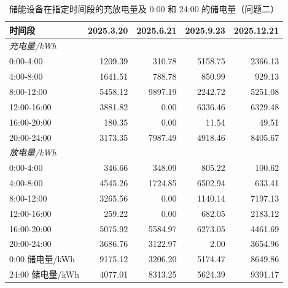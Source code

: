 \begin{table}[H]
\centering
{}
\begin{tabular}{lrrrr}
\toprule
时间段 & 2025.3.20 & 2025.6.21 & 2025.9.23 & 2025.12.21 \\
\midrule
\multicolumn{5}{l}{\textit{充电量/kWh}} \\
0:00-4:00 & 1209.39 & 310.78 & 5158.75 & 2366.13 \\
4:00-8:00 & 1641.51 & 788.78 & 850.99 & 929.13 \\
8:00-12:00 & 5458.12 & 9897.19 & 2242.72 & 5251.08 \\
12:00-16:00 & 3881.82 & 0.00 & 6336.46 & 6329.48 \\
16:00-20:00 & 180.35 & 0.00 & 11.54 & 49.51 \\
20:00-24:00 & 3173.35 & 7987.49 & 4918.46 & 8405.67 \\
\midrule
\multicolumn{5}{l}{\textit{放电量/kWh}} \\
0:00-4:00 & 346.66 & 348.09 & 805.22 & 100.62 \\
4:00-8:00 & 4545.26 & 1724.85 & 6502.94 & 633.41 \\
8:00-12:00 & 3265.56 & 0.00 & 1140.14 & 7197.13 \\
12:00-16:00 & 259.22 & 0.00 & 682.05 & 2183.12 \\
16:00-20:00 & 5075.92 & 5584.97 & 6273.05 & 4461.69 \\
20:00-24:00 & 3686.76 & 3122.97 & 2.00 & 3654.96 \\
\midrule
0:00 储电量/kWh & 9175.12 & 3206.20 & 5174.47 & 8649.86 \\
24:00 储电量/kWh & 4077.01 & 8313.25 & 5624.39 & 9391.17 \\
\bottomrule
\end{tabular}
\caption{储能设备在指定时间段的充放电量及 0:00 和 24:00 的储电量（问题二）}
\label{tab:m2-q2}
\end{table}
\par{}
